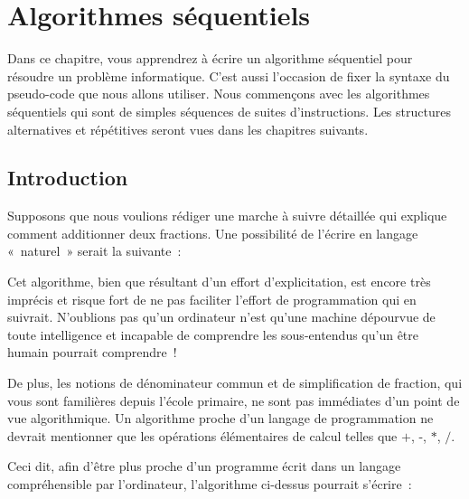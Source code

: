 \chapter{Algorithmes séquentiels}

	Dans ce chapitre, vous apprendrez à écrire un algorithme séquentiel pour
	résoudre un problème informatique. C’est aussi
	l’occasion de fixer la syntaxe du pseudo-code que nous
	allons utiliser. Nous commençons avec les algorithmes
	séquentiels qui sont de simples séquences de suites
	d’instructions. Les structures alternatives et
	répétitives seront vues dans les chapitres suivants.


	\section{Introduction}

		Supposons que nous voulions rédiger une marche
		à suivre détaillée qui explique comment additionner deux fractions. Une
		possibilité de l’écrire en langage «~naturel~» serait la suivante~:

		
		Cet algorithme, bien que résultant d’un effort
		d’explicitation, est encore très imprécis et risque fort de ne pas
		faciliter l’effort de programmation qui en suivrait. N’oublions pas
		qu’un ordinateur n’est qu’une machine dépourvue de toute intelligence
		et incapable de comprendre les sous-entendus qu’un être humain pourrait
		comprendre~!

		De plus, les notions de dénominateur commun et
		de simplification de fraction, qui vous sont 
		familières depuis l’école primaire, 
		ne sont pas immédiates d’un point de
		vue algorithmique. Un algorithme proche d’un langage
		de programmation ne devrait mentionner que les opérations élémentaires
		de calcul telles que $+$, -, $*$, $/$.

		Ceci dit, afin d’être plus proche d’un
		programme écrit dans un langage compréhensible par l’ordinateur,
		l’algorithme ci-dessus pourrait s’écrire~:


